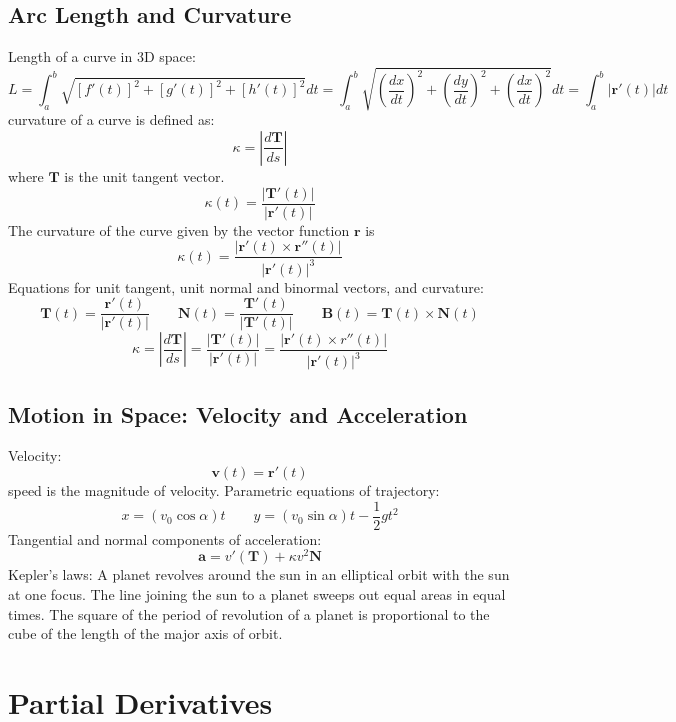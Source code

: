\documentclass{article}
\begin{document}
    \subsection{Arc Length and Curvature}
    \begin{outline}
        \1 Length of a curve in 3D space: \[L=\int^b_a\sqrt{[f'(t)]^2+[g'(t)]^2+[h'(t)]^2}dt=\int^b_a\sqrt{\left(\dfrac{dx}{dt}\right)^2+\left(\dfrac{dy}{dt}\right)^2+\left(\dfrac{dx}{dt}\right)^2}dt=\int^b_a|\mathbf r'(t)|dt\]
        \1 curvature of a curve is defined as: \[\kappa=\left|\dfrac{d\mathbf T}{ds}\right|\] where $\mathbf T$ is the unit tangent vector. 
        \1 \[\kappa(t)=\dfrac{|\mathbf T'(t)|}{|\mathbf r'(t)|}\]
        \1 The curvature of the curve given by the vector function $\mathbf r$ is \[\kappa(t)=\dfrac{|\mathbf r'(t)\times\mathbf r''(t)|}{|\mathbf r'(t)|^3}\]
        \1 Equations for unit tangent, unit normal and binormal vectors, and curvature: \[\mathbf T(t)=\dfrac{\mathbf r'(t)}{|\mathbf r'(t)|}\qquad \mathbf N(t)=\dfrac{\mathbf T'(t)}{|\mathbf T'(t)|}\qquad \mathbf B(t)=\mathbf T(t)\times\mathbf N(t)\]\[\kappa=\left|\dfrac{d\mathbf T}{ds}\right|=\dfrac{|\mathbf T'(t)|}{|\mathbf r'(t)|}=\dfrac{|\mathbf r'(t)\times r''(t)|}{|\mathbf r'(t)|^3}\]

    \end{outline}
    
    \subsection{Motion in Space: Velocity and Acceleration}
    \begin{outline}
        \1 Velocity: \[\mathbf v(t)=\mathbf r'(t)\]
        \1 speed is the magnitude of velocity. 
        \1 Parametric equations of trajectory: \[x=(v_0\cos\alpha)t\qquad y=(v_0\sin\alpha)t-\frac{1}{2}gt^2\]
        \1 Tangential and normal components of acceleration: \[\mathbf a=v'(\mathbf T)+\kappa v^2\mathbf N\]
        \1 Kepler's laws: 
            \2 A planet revolves around the sun in an elliptical orbit with the sun at one focus. 
            \2 The line joining the sun to a planet sweeps out equal areas in equal times. 
            \2 The square of the period of revolution of a planet is proportional to the cube of the length of the major axis of orbit. 
    \end{outline}

    \section{Partial Derivatives} %
\end{document}
